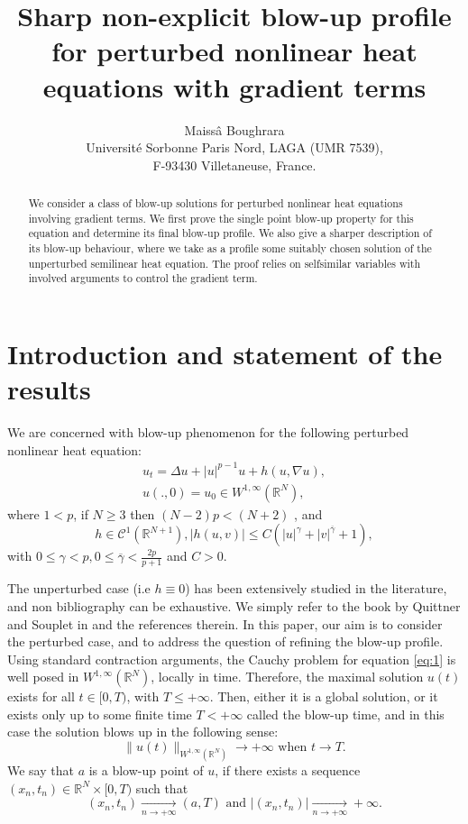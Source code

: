 \documentclass[11pt,a4paper]{article}
\title{Sharp non-explicit blow-up profile for perturbed nonlinear heat equations with gradient terms}
\author{Maissâ Boughrara\vspace{1em} \\
Université Sorbonne Paris Nord, LAGA (UMR 7539),\\ F-93430 Villetaneuse, France.}
\date{}
\newcommand{\1}{\mathbbm{1}}
\numberwithin{equation}{section}
\newcommand{\numberset}{\mathbb}
\newcommand{\R}{\numberset{R}}
\theoremstyle{remark}
\begin{document}
\maketitle

\begin{abstract}
We consider a class of blow-up solutions for perturbed nonlinear heat equations involving gradient terms. We first prove the single point blow-up property for this equation and determine its final blow-up profile. We also give a sharper description of its blow-up behaviour, where we take as a profile some suitably chosen solution of the unperturbed semilinear heat equation. The proof relies on selfsimilar variables with involved arguments to control the gradient term.
\end{abstract}

\section{Introduction and statement of the results}
We are concerned with  blow-up phenomenon for the following perturbed nonlinear heat equation:
\begin{equation}\label{eq:1}
\begin{split}
u_t=\Delta u+|u|^{p-1}u+h(u,\nabla u),\\
u(.,0)=u_0\in W^{1,\infty}(\R^N),
\end{split}
\end{equation}
where $1<p$, if $N\geq 3$ then $(N-2)p<(N+2)$ , and 
\begin{equation}\label{condition h}
h\in \mathcal{C}^1(\R^{N+1}), |h(u,v)|\leq C(|u|^{\gamma}+|v|^{\overline{\gamma}}+1),
\end{equation}
with $0\leq \gamma<p, 0\leq \overline{\gamma}<\frac{2p}{p+1}$ and $C>0$.

The unperturbed case (i.e $h\equiv0$) has been extensively studied in the literature, and non bibliography can be exhaustive. We simply refer to the book by Quittner and Souplet in \cite{SQ2019} and the references therein. In this paper, our aim is to consider the perturbed case, and to address the question of refining the blow-up profile. Using standard contraction arguments, the Cauchy problem for equation \eqref{eq:1} is well posed in $W^{1,\infty}(\R^N)$, locally in time. Therefore, the maximal solution $u(t)$ exists for all $t \in [0, T )$, with $T \leq +\infty$.
Then, either it is a global solution, or it exists only up to some finite time $T<+\infty$ called the blow-up time, and in this case the solution blows up in the following sense:
$$\|u(t)\|_{W^{1,\infty}(\R^N)}\longrightarrow +\infty \text{ when } t\rightarrow T.$$
We say that $a$ is a blow-up point of $u$, if there exists a sequence $(x_n,t_n)\in \R^{N}\times [0,T)$ such that
$$(x_n,t_n)\underset{n\rightarrow +\infty}{\longrightarrow} (a,T)\text{ and }|(x_n,t_n)|\underset{n\rightarrow +\infty}{\longrightarrow} +\infty.$$
\end{document}
